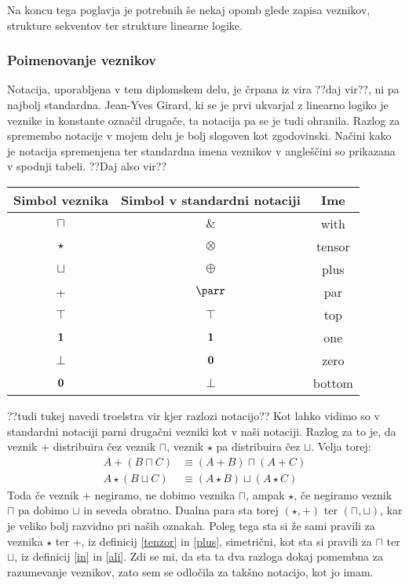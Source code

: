 Na koncu tega poglavja je potrebnih še nekaj opomb glede zapisa veznikov, strukture sekventov ter strukture linearne logike.

\subsubsection{Poimenovanje veznikov}

Notacija, uporabljena v tem diplomskem delu, je črpana iz vira ??daj vir??, ni pa najbolj standardna. Jean-Yves Girard, ki se je prvi ukvarjal z linearno logiko je veznike in konstante označil drugače, ta notacija pa se je tudi ohranila. Razlog za spremembo notacije v mojem delu je bolj slogoven kot zgodovinski. Načini kako je notacija spremenjena ter standardna imena veznikov v angleščini so prikazana v spodnji tabeli. ??Daj also vir??
\begin{center}
\begin{tabular}{||c|c|c||}
    \hline
    Simbol veznika & Simbol v standardni notaciji & Ime \\
    \hline\hline
    $\sqcap$ & $\&$ & with \\
    \hline
    $\star$ & $\otimes$ & tensor \\
    \hline
    $\sqcup$ & $\oplus$ & plus \\
    \hline
    + & $\parr$ & par \\
    \hline
    $\top$ & $\top$ & top \\
    \hline
    $\mathbf{1}$ & $\mathbf{1}$ & one \\
    \hline
    $\bot$ & $\mathbf{0}$ & zero \\
    \hline
    $\mathbf{0}$ & $\bot$ & bottom \\
    \hline
    \end{tabular}
\end{center}

??tudi tukej navedi troelstra vir kjer razlozi notacijo??
Kot lahko vidimo so v standardni notaciji parni drugačni vezniki kot v naši notaciji. Razlog za to je, da veznik + distribuira čez veznik $\sqcap$, veznik $\star$ pa distribuira čez $\sqcup$. Velja torej:
\begin{align*}
    A + (B \sqcap C) &\equiv (A + B) \sqcap (A + C)\\
    A \star (B \sqcup C) &\equiv (A \star B) \sqcup (A \star C)
\end{align*}
Toda če veznik + negiramo, ne dobimo veznika $\sqcap$, ampak $\star$, če negiramo veznik $\sqcap$ pa dobimo $\sqcup$ in seveda obratno. Dualna para sta torej $(\star,+)$ ter $(\sqcap,\sqcup)$, kar je veliko bolj razvidno pri naših oznakah. Poleg tega sta si že sami pravili za veznika $\star$ ter +, iz definicij \ref{tenzor} in \ref{plus}, simetrični, kot sta si pravili za $\sqcap$ ter $\sqcup$, iz definicij \ref{in} in \ref{ali}. Zdi se mi, da sta ta dva razloga dokaj pomembna za razumevanje veznikov, zato sem se odločila za takšno notacijo, kot jo imam.

